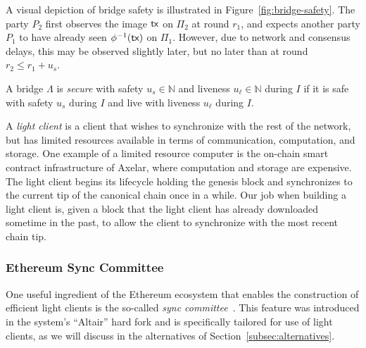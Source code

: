 A visual depiction of bridge safety is illustrated in Figure~\ref{fig:bridge-safety}.
The party $P_2$ first observes the image $\textsf{tx}$ on $\Pi_2$ at round $r_1$, and expects
another party $P_1$ to have already seen $\phi^{-1}(\textsf{tx})$ on $\Pi_1$. However, due to
network and consensus delays, this may be observed slightly later, but no later than at
round $r_2 \leq r_1 + u_s$.

\begin{definition}
  A bridge $\Lambda$ is \emph{secure} with safety $u_s \in \mathbb{N}$ and
  liveness $u_\ell \in \mathbb{N}$ during $I$ if it is safe with safety $u_s$ during $I$
  and live with liveness $u_\ell$ during $I$.
\end{definition}


A \emph{light client} is a client that wishes to synchronize with the rest
of the network, but has limited resources available in terms of communication,
computation, and storage. One example of a limited resource computer is the
on-chain smart contract infrastructure of Axelar, where computation and storage
are expensive. The light client begins its lifecycle holding the genesis block
and synchronizes to the current tip of the canonical chain once in a while.
Our job when building a light client is, given a block that the light client
has already downloaded sometime in the past, to allow the client to
synchronize with the most recent chain tip.


\subsubsection{Ethereum Sync Committee}\label{subsec:sync-committee}

One useful ingredient of the Ethereum ecosystem that enables the
construction of efficient light clients is the so-called \emph{sync committee}~\cite{sync-committee}.
This feature was introduced in the system's
``Altair'' hard fork and is specifically tailored for use of light clients, as
we will discuss in the alternatives of Section~\ref{subsec:alternatives}.

